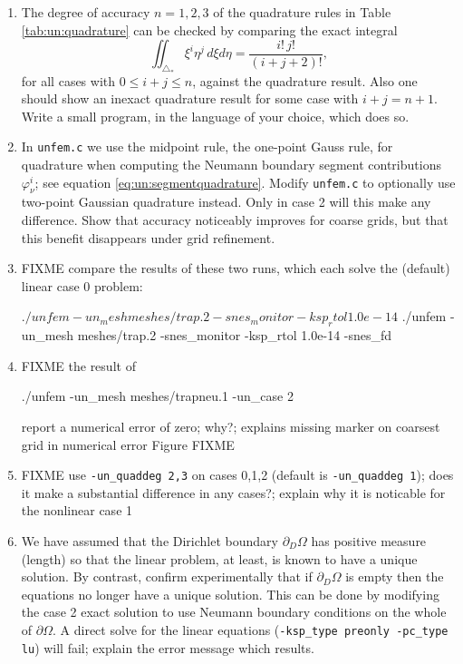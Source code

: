 \begin{enumerate}
\item  \label{exer:un:checkquadrature}  The degree of accuracy $n=1,2,3$ of the quadrature rules in Table \ref{tab:un:quadrature} can be checked by comparing the exact integral
\begin{equation}
\iint_{\triangle_\ast} \xi^i \eta^j\,d\xi d\eta = \frac{i!\,j!}{(i+j+2)!}, \label{eq:un:checkquadrature}
\end{equation}
for all cases with $0\le i+j\le n$, against the quadrature result.  Also one should show an inexact quadrature result for some case with $i+j=n+1$.  Write a small program, in the language of your choice, which does so.
\item \label{exer:un:gaussneumann}  In \texttt{unfem.c} we use the midpoint rule, the one-point Gauss rule, for quadrature when computing the Neumann boundary segment contributions $\varphi_\nu^i$; see equation \eqref{eq:un:segmentquadrature}.  Modify \texttt{unfem.c} to optionally use two-point Gaussian quadrature instead.  Only in case 2 will this make any difference.  Show that accuracy noticeably improves for coarse grids, but that this benefit disappears under grid refinement.
\item FIXME compare the results of these two runs, which each solve the (default) linear case 0 problem:
\begin{cline}
$ ./unfem -un_mesh meshes/trap.2 -snes_monitor -ksp_rtol 1.0e-14
$ ./unfem -un_mesh meshes/trap.2 -snes_monitor -ksp_rtol 1.0e-14 -snes_fd
\end{cline}
\item FIXME the result of
\begin{cline}
./unfem -un_mesh meshes/trapneu.1 -un_case 2
\end{cline}
report a numerical error of zero; why?; explains missing marker on coarsest grid in numerical error Figure FIXME
\item FIXME use \texttt{-un\_quaddeg 2,3} on cases 0,1,2 (default is \texttt{-un\_quaddeg 1}); does it make a substantial difference in any cases?; explain why it is noticable for the nonlinear case 1
\item \label{exer:un:allneumannfailure}  We have assumed that the Dirichlet boundary $\partial_D \Omega$ has positive measure (length) so that the linear problem, at least, is known to have a unique solution.  By contrast, confirm experimentally that if $\partial_D\Omega$ is empty then the equations no longer have a unique solution.  This can be done by modifying the case 2 exact solution to use Neumann boundary conditions on the whole of $\partial \Omega$.  A direct solve for the linear equations (\texttt{-ksp\_type preonly -pc\_type lu}) will fail; explain the error message which results.

\end{enumerate}
